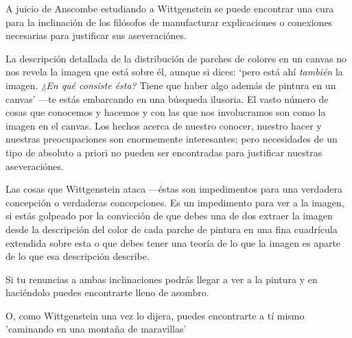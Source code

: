 A juicio de Anscombe estudiando a Wittgenstein se puede encontrar una cura
para la inclinación de los filósofos de manufacturar explicaciones o
conexiones necesarias para justificar sus aseveraciónes.

La descripción detallada de la distribución de parches de colores en un
canvas no nos revela la imagen que está sobre él, aunque si dices: `pero
está ahí \emph{también} la imagen. \emph{¿En qué consiste ésta?} Tiene
que haber algo además de pintura en un canvas' ---te estás embarcando en
una búsqueda ilusoria. El vasto número de cosas que conocemos y hacemos
y con las que nos involucramos son como la imagen en el canvas. Los
hechos acerca de nuestro conocer, nuestro hacer y nuestras
preocupaciones son enormemente interesantes; pero necesidades de un tipo
de absoluto a priori no pueden ser encontradas para justificar nuestras
aseveraciónes.

Las cosas que Wittgenstein ataca ---éstas son impedimentos para una verdadera
concepción o verdaderas concepciones. Es un impedimento para ver a la imagen,
si estás golpeado por la convicción de que debes una de dos extraer la imagen
desde la descripción del color de cada parche de pintura en una fina
cuadrícula extendida sobre esta o que debes tener una teoría de lo que la
imagen es aparte de lo que esa descripción describe.

Si tu renuncias a ambas inclinaciones podrás llegar a ver a la pintura y en
haciéndolo puedes encontrarte lleno de asombro.

O, como Wittgenstein una vez lo dijera, puedes encontrarte a tí mismo 'caminando
en una montaña de maravillas'



